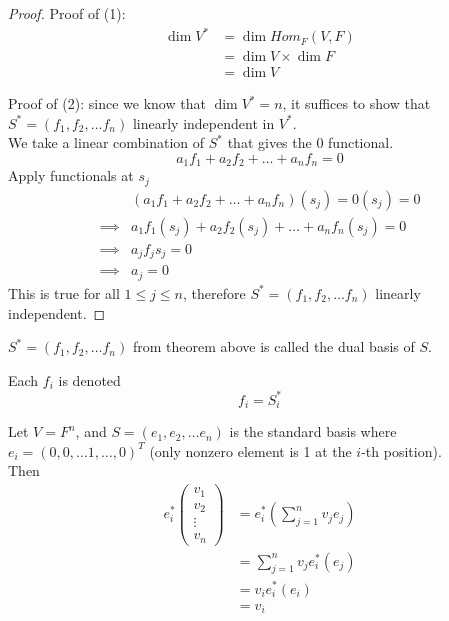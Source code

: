 \begin{proof}

    Proof of (1): 
    \begin{align*}
        \dim V^* &= \dim Hom_F(V, F) \\
        &= \dim V \times \dim F \\
        &= \dim V
    \end{align*}

    Proof of (2): since we know that $\dim V^* = n$, it suffices to show that $S^* = (f_1, f_2, \hdots f_n)$ linearly independent in $V^*$. \\

    We take a linear combination  of $S^*$ that gives the $0$ functional. 
    \[
        a_1 f_1 + a_2 f_2 + \hdots + a_n f_n = 0
    \]
    Apply functionals at $s_j$
    \begin{align*}
        &(a_1 f_1 + a_2 f_2 + \hdots + a_n f_n)(s_j) = 0 (s_j) = 0 \\
        \implies & a_1 f_1 (s_j) + a_2 f_2 (s_j) + \hdots + a_n f_n (s_j) = 0 \\
        \implies & a_j f_j s_j = 0 \\
        \implies & a_j = 0
    \end{align*}
    This is true for all $1 \leq j \leq n$, therefore $S^* = (f_1, f_2, \hdots f_n)$ linearly independent.
\end{proof}

\begin{definition}
    $S^* = (f_1, f_2, \hdots f_n)$ from theorem above is called the dual basis of $S$. 

    Each $f_i$ is denoted 
    \[
        f_i = S_i^*
    \]
    
\end{definition}

\begin{example}
    Let $V = F^n$, and $S = (e_1, e_2, \hdots e_n)$ is the standard basis where $e_i = (0, 0, \hdots 1, \hdots, 0)^T$  (only nonzero element is 1 at the $i$-th position). \\

    Then 
    \begin{align*}
        e_i^* \begin{pmatrix} v_1 \\ v_2 \\ \vdots \\ v_n \end{pmatrix}  &= e_i^* \left( \sum\limits_{j= 1}^{n} v_j e_j  \right) \\
        &= \sum\limits_{j = 1}^{n}  v_j e_i^*(e_j ) \\
        &= v_i e_i^* (e_i) \\
        &= v_i
    \end{align*}
\end{example}


